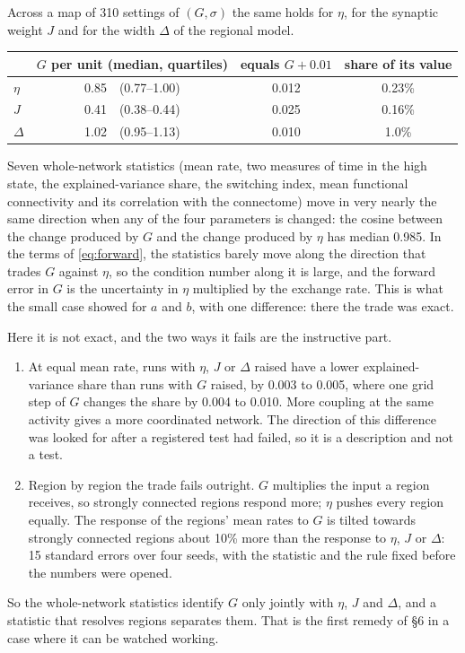\documentclass[11pt]{article}
\newenvironment{newtext}{\par\color{teal!55!black}}{\par}
\begin{document}
\begin{newtext}
Across a map of 310 settings of $(G,\sigma)$ the same holds for $\eta$, for the synaptic weight $J$ and for the width $\Delta$ of the regional model.
\begin{center}\small
\begin{tabular}{@{}lccc@{}}
\toprule
 & $G$ per unit (median, quartiles) & equals $G+0.01$ & share of its value \\
\midrule
$\eta$ & 0.85\ \ (0.77--1.00) & 0.012 & 0.23\% \\
$J$ & 0.41\ \ (0.38--0.44) & 0.025 & 0.16\% \\
$\Delta$ & 1.02\ \ (0.95--1.13) & 0.010 & 1.0\% \\
\bottomrule
\end{tabular}
\end{center}
Seven whole-network statistics (mean rate, two measures of time in the high state, the explained-variance share, the switching index, mean functional connectivity and its correlation with the connectome) move in very nearly the same direction when any of the four parameters is changed: the cosine between the change produced by $G$ and the change produced by $\eta$ has median 0.985. In the terms of \eqref{eq:forward}, the statistics barely move along the direction that trades $G$ against $\eta$, so the condition number along it is large, and the forward error in $G$ is the uncertainty in $\eta$ multiplied by the exchange rate. This is what the small case showed for $a$ and $b$, with one difference: there the trade was exact.

Here it is not exact, and the two ways it fails are the instructive part.
\begin{enumerate}
\item At equal mean rate, runs with $\eta$, $J$ or $\Delta$ raised have a lower explained-variance share than runs with $G$ raised, by 0.003 to 0.005, where one grid step of $G$ changes the share by 0.004 to 0.010. More coupling at the same activity gives a more coordinated network. The direction of this difference was looked for after a registered test had failed, so it is a description and not a test.
\item Region by region the trade fails outright. $G$ multiplies the input a region receives, so strongly connected regions respond more; $\eta$ pushes every region equally. The response of the regions' mean rates to $G$ is tilted towards strongly connected regions about 10\% more than the response to $\eta$, $J$ or $\Delta$: 15 standard errors over four seeds, with the statistic and the rule fixed before the numbers were opened.
\end{enumerate}
So the whole-network statistics identify $G$ only jointly with $\eta$, $J$ and $\Delta$, and a statistic that resolves regions separates them. That is the first remedy of \S6 in a case where it can be watched working.


\end{newtext}
\end{document}
